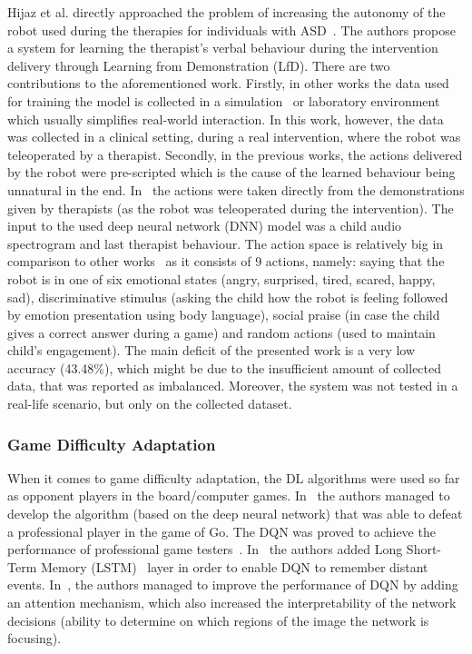 \documentclass[thesis]{mas_proposal}
\begin{document}
Hijaz et al. directly approached the problem of increasing the autonomy of the robot used during the therapies for individuals with ASD~\cite{Hijaz2021}. The authors propose a system for learning the therapist's verbal behaviour during the intervention delivery through Learning from Demonstration (LfD). There are two contributions to the aforementioned work. Firstly, in other works the data used for training the model is collected in a simulation~\cite{Turner2018,Belo2021,Belo2022} or laboratory environment~\cite{ClarkTurner2017,Turner2018,Romeo2018} which usually simplifies real-world interaction. In this work, however, the data was collected in a clinical setting, during a real intervention, where the robot was teleoperated by a therapist. Secondly, in the previous works, the actions delivered by the robot were pre-scripted which is the cause of the learned behaviour being unnatural in the end. In~\cite{Hijaz2021} the actions were taken directly from the demonstrations given by therapists (as the robot was teleoperated during the intervention). The input to the used deep neural network (DNN) model was a child audio spectrogram and last therapist behaviour. The action space is relatively big in comparison to other works~\cite{Qureshi2016,Qureshi2017,Qureshi2018,ClarkTurner2017,Turner2018,Belo2021,Belo2022,Romeo2018,Romeo2019} as it consists of 9 actions, namely: saying that the robot is in one of six emotional states (angry, surprised, tired, scared, happy, sad), discriminative stimulus (asking the child how the robot is feeling followed by emotion presentation using body language), social praise (in case the child gives a correct answer during a game) and random actions (used to maintain child's engagement). The main deficit of the presented work is a very low accuracy (43.48\%), which might be due to the insufficient amount of collected data, that was reported as imbalanced. Moreover, the system was not tested in a real-life scenario, but only on the collected dataset. 

\subsubsection{Game Difficulty Adaptation}
When it comes to game difficulty adaptation, the DL algorithms were used so far as opponent players in the board/computer games. In~\cite{Silver2016} the authors managed to develop the algorithm (based on the deep neural network) that was able to defeat a professional player in the game of Go. The DQN was proved to achieve the performance of professional game testers~\cite{mnih2015human}. In~\cite{hausknecht2015deep} the authors added Long Short-Term Memory (LSTM)~\cite{hochreiter1997long} layer in order to enable DQN to remember distant events. In~\cite{sorokin2015deep}, the authors managed to improve the performance of DQN by adding an attention mechanism, which also increased the interpretability of the network decisions (ability to determine on which regions of the image the network is focusing). 
\end{document}
